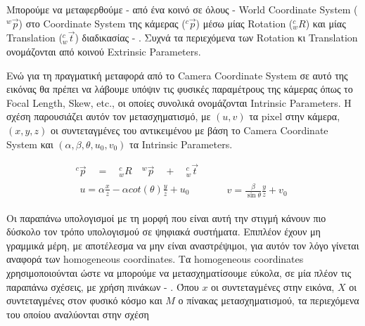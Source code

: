 Μπορούμε να μεταφερθούμε - από ένα κοινό σε όλους - World Coordinate System (${}^{w}\overrightarrow{p}$) στο Coordinate System της κάμερας (${}^{c}\overrightarrow{p}$) μέσω μίας Rotation (${}^{c}_{w}R$) και μίας Translation (${}^{c}_{w}\overrightarrow{t}$) διαδικασίας - . Συχνά τα περιεχόμενα των Rotation κι Translation ονομάζονται από κοινού Extrinsic Parameters.

Ενώ για τη πραγματική μεταφορά από το Camera Coordinate System σε αυτό της εικόνας θα πρέπει να λάβουμε υπόψιν τις φυσικές παραμέτρους της κάμερας όπως το Focal Length, Skew, etc., οι οποίες συνολικά ονομάζονται Intrinsic Parameters. Η σχέση  παρουσιάζει αυτόν τον μετασχηματισμό, με $(u,v)$ τα pixel στην κάμερα, $(x,y,z)$ οι συντεταγμένες του αντικειμένου με βάση το Camera Coordinate System και $(\alpha, \beta, \theta, u_0, v_0)$ τα Intrinsic Parameters.


\begin{gather}
	{}^{c}\overrightarrow{p} \quad = \quad {}^{c}_{w}R \quad {}^{w}\overrightarrow{p} \quad + \quad {}^{c}_{w}\overrightarrow{t} \label{eq:world-to-camera-frame}\\
    \begin{matrix}
        u = \alpha \frac{x}{z} - \alpha cot(\theta)\frac{y}{z} + u_0
    \end{matrix} 
    \quad \quad \quad
    \begin{matrix}
        v = \frac{\beta}{\sin{\theta}} \frac{y}{z} + v_0
    \end{matrix} \label{eq:camera-to-image-plane}
\end{gather}

Οι παραπάνω υπολογισμοί με τη μορφή που είναι αυτή την στιγμή κάνουν πιο δύσκολο τον τρόπο υπολογισμού σε ψηφιακά συστήματα. Επιπλέον έχουν μη γραμμικά μέρη, με αποτέλεσμα να μην είναι αναστρέψιμοι, για αυτόν τον λόγο γίνεται αναφορά των homogeneous coordinates. Τα homogeneous coordinates χρησιμοποιούνται ώστε να μπορούμε να μετασχηματίσουμε εύκολα, σε μία πλέον τις παραπάνω σχέσεις, με χρήση πινάκων - . Όπου $x$ οι συντεταγμένες στην εικόνα, $X$ οι συντεταγμένες στον φυσικό κόσμο και $M$ ο πίνακας μετασχηματισμού, τα περιεχόμενα του οποίου αναλύονται στην σχέση  


